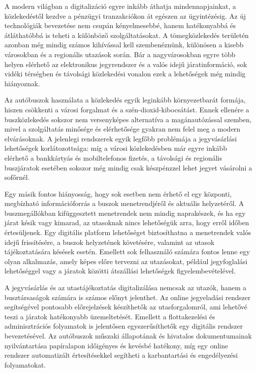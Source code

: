 
A modern világban a digitalizáció egyre inkább áthatja mindennapjainkat, a közlekedéstől kezdve a pénzügyi tranzakciókon át egészen az ügyintézésig. Az új technológiák bevezetése nem csupán kényelmesebbé, hanem hatékonyabbá és átláthatóbbá is teheti a különböző szolgáltatásokat. A tömegközlekedés területén azonban még mindig számos kihívással kell szembenéznünk, különösen a kisebb városokban és a regionális utazások során. Bár a nagyvárosokban egyre több helyen elérhető az elektronikus jegyrendszer és a valós idejű járatinformáció, sok vidéki térségben és távolsági közlekedési vonalon ezek a lehetőségek még mindig hiányoznak.

Az autóbuszok használata a közlekedés egyik leginkább környezetbarát formája, hiszen csökkenti a városi forgalmat és a szén-dioxid-kibocsátást. Ennek ellenére a buszközlekedés sokszor nem versenyképes alternatíva a magánautózással szemben, mivel a szolgáltatás minősége és elérhetősége gyakran nem felel meg a modern elvárásoknak. A jelenlegi rendszerek egyik legfőbb problémája a jegyvásárlási lehetőségek korlátozottsága: míg a városi közlekedésben már egyre inkább elérhető a bankkártyás és mobiltelefonos fizetés, a távolsági és regionális buszjáratok esetében sokszor még mindig csak készpénzzel lehet jegyet vásárolni a sofőrnél.

Egy másik fontos hiányosság, hogy sok esetben nem érhető el egy központi, megbízható információforrás a buszok menetrendjéről és aktuális helyzetéről. A buszmegállókban kifüggesztett menetrendek nem mindig naprakészek, és ha egy járat késik vagy kimarad, az utasoknak nincs lehetőségük arra, hogy erről időben értesüljenek. Egy digitális platform lehetőséget biztosíthatna a menetrendek valós idejű frissítésére, a buszok helyzetének követésére, valamint az utasok tájékoztatására késések esetén. Emellett sok felhasználó számára fontos lenne egy olyan alkalmazás, amely képes előre tervezni az utazásokat, például jegyfoglalási lehetőséggel vagy a járatok közötti átszállási lehetőségek figyelembevételével.

A jegyvásárlás és az utastájékoztatás digitalizálása nemcsak az utazók, hanem a busztársaságok számára is számos előnyt jelenthet. Az online jegyeladási rendszer segítségével pontosabb előrejelzések készíthetők az utasforgalomról, ami lehetővé teszi a járatok hatékonyabb üzemeltetését. Emellett a flottakezelési és adminisztrációs folyamatok is jelentősen egyszerűsíthetők egy digitális rendszer bevezetésével. Az autóbuszok műszaki állapotának és hivatalos dokumentumainak nyilvántartása papíralapon időigényes és kevésbé hatékony, míg egy online rendszer automatizált értesítésekkel segítheti a karbantartási és engedélyezési folyamatokat.

